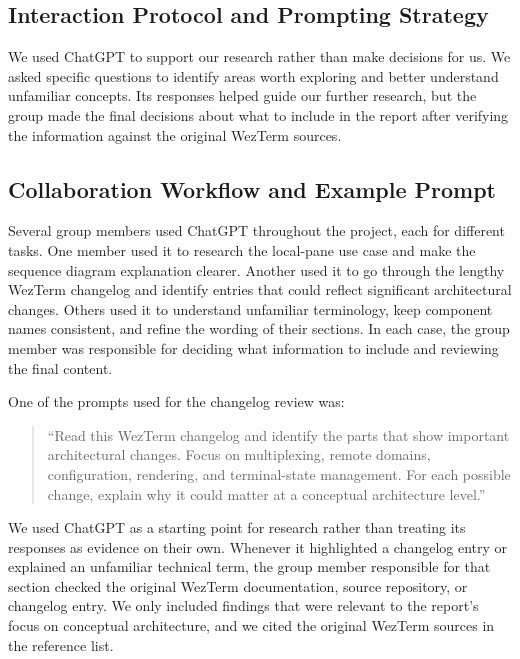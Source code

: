 \subsection{Interaction Protocol and Prompting Strategy}
\label{sec:ai-protocol}

We used ChatGPT to support our research rather than make decisions for us. We asked specific questions to identify areas worth exploring and better understand unfamiliar concepts. Its responses helped guide our further research, but the group made the final decisions about what to include in the report after verifying the information against the original WezTerm sources.

\subsection{Collaboration Workflow and Example Prompt}
\label{sec:ai-workflow}

Several group members used ChatGPT throughout the project, each for different tasks. One member used it to research the local-pane use case and make the sequence diagram explanation clearer. Another used it to go through the lengthy WezTerm changelog and identify entries that could reflect significant architectural changes. Others used it to understand unfamiliar terminology, keep component names consistent, and refine the wording of their sections. In each case, the group member was responsible for deciding what information to include and reviewing the final content.

One of the prompts used for the changelog review was:

\begin{quote}
\small
``Read this WezTerm changelog and identify the parts that show important architectural changes. Focus on multiplexing, remote domains, configuration, rendering, and terminal-state management. For each possible change, explain why it could matter at a conceptual architecture level.''
\end{quote}

We used ChatGPT as a starting point for research rather than treating its responses as evidence on their own. Whenever it highlighted a changelog entry or explained an unfamiliar technical term, the group member responsible for that section checked the original WezTerm documentation, source repository, or changelog entry. We only included findings that were relevant to the report's focus on conceptual architecture, and we cited the original WezTerm sources in the reference list.

